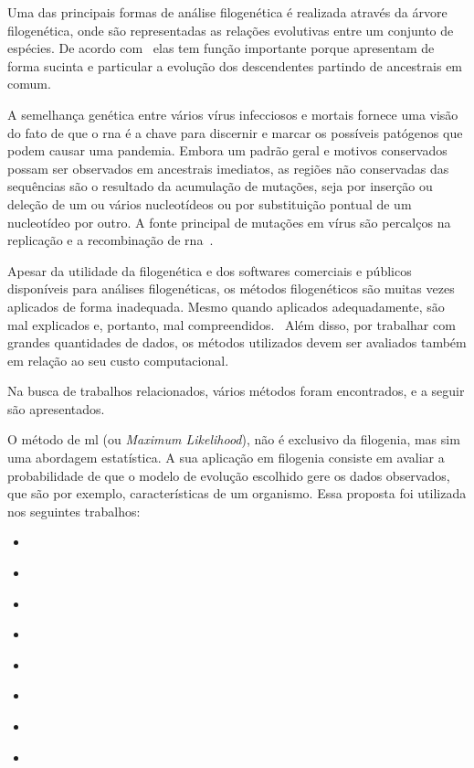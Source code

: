 Uma das principais formas de análise filogenética é realizada através da árvore filogenética, onde são representadas as relações evolutivas entre um conjunto de espécies. De acordo com~\citeauthor{morrison_tree_thinking} elas tem função importante porque apresentam de forma sucinta e particular a evolução dos descendentes partindo de ancestrais em comum.

A semelhança genética entre vários vírus infecciosos e mortais fornece uma visão do fato de que o \gls{rna} é a chave para discernir e marcar os possíveis patógenos que podem causar uma pandemia. Embora um padrão geral e motivos conservados possam ser observados em ancestrais imediatos, as regiões não conservadas das sequências são o resultado da acumulação de mutações, seja por inserção ou deleção de um ou vários nucleotídeos ou por substituição pontual de um nucleotídeo por outro. A fonte principal de mutações em vírus são percalços na replicação e a recombinação de \gls{rna}~\cite{behl_threat_2022}.

Apesar da utilidade da filogenética e dos softwares comerciais e públicos disponíveis para análises filogenéticas, os métodos filogenéticos são muitas vezes aplicados de forma inadequada. Mesmo quando aplicados adequadamente, são mal explicados e, portanto, mal compreendidos.~\cite[p. 1]{barry_phylogenetic_analysis_2006} Além disso, por trabalhar com grandes quantidades de dados, os métodos utilizados devem ser avaliados também em relação ao seu custo computacional.

Na busca de trabalhos relacionados, vários métodos foram encontrados, e a seguir são apresentados.

O método de \gls{ml} (ou \textit{Maximum Likelihood}), não é exclusivo da filogenia, mas sim uma abordagem estatística. A sua aplicação em filogenia consiste em avaliar a probabilidade de que o modelo de evolução escolhido gere os dados observados, que são por exemplo, características de um organismo. Essa proposta foi utilizada nos seguintes trabalhos:
\begin{itemize}
  \item \citeauthor{behl_threat_2022}
  \item \citeauthor{fall_genetic_diversity_2021}
  \item \citeauthor{shabbir_comprehensive_2020}
  \item \citeauthor{hudu_hepatitis_2018}
  \item \citeauthor{sallard_tracing_2021}
  \item \citeauthor{paez-espino_diversity_evolution_2019}
  \item \citeauthor{tang_evolutionary_2021}
  \item \citeauthor{cho_analysis_2022}
\end{itemize}

